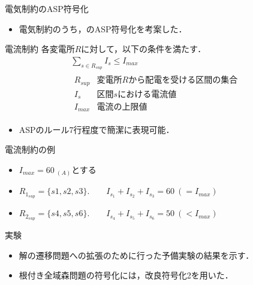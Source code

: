 \documentclass[dvipdfmx,11pt]{beamer}
\begin{document}
\begin{frame}{電気制約のASP符号化}
 \begin{itemize}
  \item 電気制約のうち，のASP符号化を考案した．
 \end{itemize}
 \begin{block}{電流制約}
  各変電所$R$に対して，以下の条件を満たす．
  \begin{gather*}
   \sum_{s \in R_{sup}} I_s \leq I_{max} \\
   \begin{array}{ll}
    R_{sup} & \text{変電所$R$から配電を受ける区間の集合} \\
    I_s &  \text{区間$s$における電流値} \\
    I_{max} & \text{電流の上限値} 
   \end{array}
  \end{gather*}
 \end{block}\vfill
 \begin{itemize}
  \item ASPのルール7行程度で簡潔に表現可能．
 \end{itemize}
\end{frame}
\begin{frame}{電流制約の例}
\begin{itemize}
  \item $I_{max} = 60~{}_{(A)}$とする
\end{itemize}
 \begin{figure}[h]
  \centering
 \scalebox{1.3}{}
 \end{figure}\vfill
\begin{itemize}
 \item $R_{1_{sup}} = \{s1,s2,s3\}. \qquad I_{s_1} + I_{s_2} +I_{s_3} = 60~ (= I_{max})$
 \item $R_{2_{sup}} = \{s4,s5,s6\}. \qquad I_{s_4} + I_{s_5} +I_{s_6} = 50~ (< I_{max})$
\end{itemize}
\end{frame}
\begin{frame}{実験}
  \renewcommand{\thefootnote}{\fnsymbol{footnote}}
  \setcounter{footnote}{1}
 \begin{itemize}
  \item 解の遷移問題への拡張のために行った予備実験の結果を示す．
  \item 根付き全域森問題の符号化には，改良符号化2を用いた．
 \end{itemize}
 \begin{table}[t]
 
 \end{table}\vfill
\end{frame}
\end{document}
